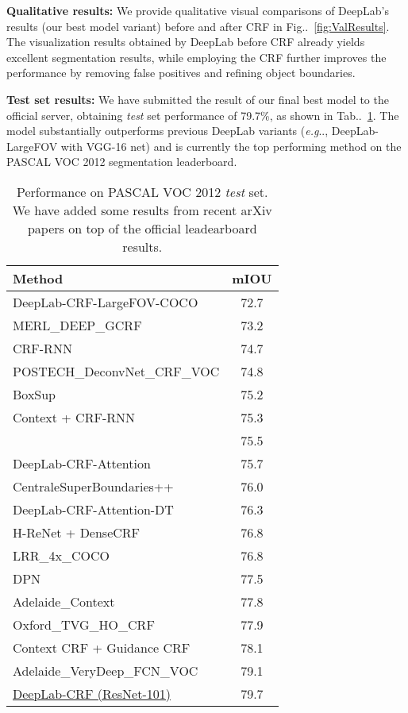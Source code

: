 \documentclass[10pt,journal,compsoc]{IEEEtran}
\makeatletter
\newcommand{\figref}[1]{Fig\onedot~\ref{#1}}
\newcommand{\tabref}[1]{Tab\onedot~\ref{#1}}
\def\onedot{\ifx\@let@token.\else.\null\fi\xspace}
\def\eg{\emph{e.g}\onedot} \def\Eg{\emph{E.g}\onedot}
\makeatother
\begin{document}
\textbf{Qualitative results:} We provide qualitative visual comparisons of DeepLab's
results (our best model variant) before and after CRF in \figref{fig:ValResults}.
The visualization results obtained by DeepLab before CRF already yields excellent
segmentation results, while employing the CRF further improves the performance by
removing false positives and refining object boundaries. 




\textbf{Test set results:} We have submitted the result of our final best model
to the official server, obtaining \textit{test} set performance of 79.7\%, as
shown in \tabref{tab:res_testset}. The model substantially outperforms previous
DeepLab variants (\eg, DeepLab-LargeFOV with VGG-16 net) and is currently the
top performing method on the PASCAL VOC 2012 segmentation leaderboard. 



\begin{table}[!th]
  \centering
  \addtolength{\tabcolsep}{2.5pt}
  \begin{tabular}{l | c}
    \toprule[0.2 em]
    {\bf Method} & {\bf mIOU} \\
    \toprule[0.2 em]
DeepLab-CRF-LargeFOV-COCO \cite{papandreou2015weakly} & 72.7\\
    MERL\_DEEP\_GCRF \cite{Vemulapalli2016Gaussian} & 73.2 \\
    CRF-RNN \cite{zheng2015conditional} & 74.7 \\
    POSTECH\_DeconvNet\_CRF\_VOC \cite{noh2015learning} & 74.8 \\
    BoxSup \cite{dai2015boxsup} & 75.2 \\
    Context + CRF-RNN \cite{yu2015multi} & 75.3 \\
     \cite{chandra2016fast} & 75.5 \\
    DeepLab-CRF-Attention \cite{chen2015attention} & 75.7 \\
    CentraleSuperBoundaries++ \cite{kokkinos2016pushing} & 76.0 \\
    DeepLab-CRF-Attention-DT  \cite{chen2015semantic} & 76.3 \\
    H-ReNet + DenseCRF \cite{yan2016combining} & 76.8 \\
    LRR\_4x\_COCO \cite{ghiasi2016laplacian} & 76.8 \\
    DPN \cite{liu2015semantic} & 77.5 \\
    Adelaide\_Context \cite{lin2015efficient} & 77.8 \\
    Oxford\_TVG\_HO\_CRF \cite{arnab2015higher} & 77.9 \\
    Context CRF + Guidance CRF \cite{Shen2016Fast} & 78.1 \\
    Adelaide\_VeryDeep\_FCN\_VOC \cite{wu2016bridging} & 79.1 \\
    \midrule
    \href{http://host.robots.ox.ac.uk:8080/anonymous/FLHY8R.html}{DeepLab-CRF (ResNet-101)} & 79.7 \\
\bottomrule[0.1 em]
  \end{tabular}
  \caption{Performance on PASCAL VOC 2012 {\it test} set. We have added some
    results from recent arXiv papers on top of the official leadearboard results.}
  \label{tab:res_testset}
\end{table}
\end{document}
